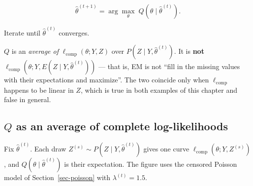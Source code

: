 \documentclass[
  letterpaper,
  DIV=11,
  numbers=noendperiod]{scrreprt}
\begin{document}
\[
\hat\theta^{(t+1)} = \arg\max_{\theta} \; Q\!\left(\theta \mid \hat\theta^{(t)}\right).
\]

Iterate until \(\hat\theta^{(t)}\) converges.

\begin{tcolorbox}[enhanced jigsaw, arc=.35mm, bottomrule=.15mm, bottomtitle=1mm, breakable, colback=white, colbacktitle=quarto-callout-warning-color!10!white, colframe=quarto-callout-warning-color-frame, coltitle=black, left=2mm, leftrule=.75mm, opacityback=0, opacitybacktitle=0.6, rightrule=.15mm, title=\textcolor{quarto-callout-warning-color}{\faExclamationTriangle}\hspace{0.5em}{A common misreading}, titlerule=0mm, toprule=.15mm, toptitle=1mm]

\(Q\) is an \emph{average of} \(\ell_{\text{comp}}(\theta; Y, Z)\) over
\(P(Z \mid Y, \hat\theta^{(t)})\). It is \textbf{not}
\(\ell_{\text{comp}}\!\left(\theta; Y, E(Z \mid Y, \hat\theta^{(t)})\right)\)
--- that is, EM is not ``fill in the missing values with their
expectations and maximize''. The two coincide only when
\(\ell_{\text{comp}}\) happens to be linear in \(Z\), which is true in
both examples of this chapter and false in general.

\end{tcolorbox}

\subsection{\texorpdfstring{\(Q\) as an average of complete
log-likelihoods}{Q as an average of complete log-likelihoods}}\label{q-as-an-average-of-complete-log-likelihoods}

Fix \(\hat\theta^{(t)}\). Each draw
\(Z^{(s)} \sim P(Z \mid Y, \hat\theta^{(t)})\) gives one curve
\(\ell_{\text{comp}}(\theta; Y, Z^{(s)})\), and
\(Q(\theta \mid \hat\theta^{(t)})\) is their expectation. The figure
uses the censored Poisson model of Section~\ref{sec-poisson} with
\(\lambda^{(t)} = 1.5\).
\end{document}

